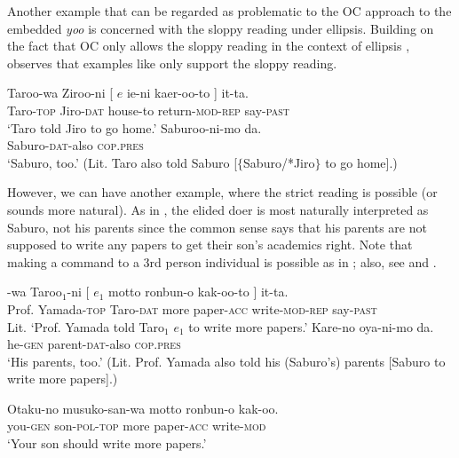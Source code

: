 \documentclass[output=paper]{langsci/langscibook}
\begin{document}
Another example that can be regarded as problematic to the OC approach to the embedded \textit{yoo} is concerned with the sloppy reading under ellipsis. Building on the fact that OC only allows the sloppy reading in the context of ellipsis \citep{hornstein1999}, \citet{fujii2006} observes that examples like  only support the sloppy reading. 

\ea\label{shimamu18}
\begin{xlist}
\ex \gll Taroo-wa Ziroo-ni [ $e$ ie-ni kaer-oo-to ] it-ta.\\
Taro-\textsc{top} Jiro-\textsc{dat} {} {} house-to return-\textsc{mod-rep} {} say-\textsc{past}\\
\glt `Taro told Jiro to go home.'
\ex \gll Saburoo-ni-mo da.\\
Saburo-\textsc{dat}-also \textsc{cop.pres}\\
\glt `Saburo, too.' (Lit. Taro also told Saburo [$\{$Saburo/*Jiro$\}$ to go home].)
\end{xlist}
\z
However, we can have another example, where the strict reading is possible (or sounds more natural). As in , the elided doer is most naturally interpreted as Saburo, not his parents since the common sense says that his parents are not supposed to write any papers to get their son's academics right. Note that making a command to a 3rd person individual is possible as in ; also, see  and .

\ea\label{shimamu19}
\begin{xlist}
\ex {}-wa Taroo$_1$-ni [ $e_{1}$ motto ronbun-o kak-oo-to ] it-ta.\\
{Prof. Yamada}-\textsc{top} Taro-\textsc{dat} {} {} more paper-\textsc{acc} write-\textsc{mod-rep} {} say-\textsc{past}\\
\glt Lit. `Prof. Yamada told Taro$_1$ $e_{1}$ to write more papers.'
\ex\label{shimamu19b} \gll Kare-no oya-ni-mo da.\\
he-\textsc{gen} parent-\textsc{dat}-also \textsc{cop.pres}\\
\glt `His parents, too.' (Lit. Prof. Yamada also told his (Saburo's) parents [Saburo to write more papers].)\\
\end{xlist}
\z
\ea\label{shimamu20} \gll Otaku-no musuko-san-wa motto ronbun-o kak-oo.\\
you-\textsc{gen} son-\textsc{pol-top} more paper-\textsc{acc} write-\textsc{mod}\\
\glt `Your son should write more papers.'
\z
\end{document}
